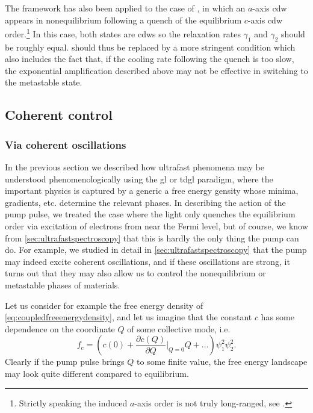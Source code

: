 The framework has also been applied to the case of , in which an $a$-axis \gls{cdw} appears in nonequilibrium following a quench of the equilibrium $c$-axis \gls{cdw} order.\footnote{Strictly speaking the induced $a$-axis order is not truly long-ranged, see \citet{zong_role_2021}.}
In this case, both states are \glspl{cdw} so the relaxation rates $\gamma_1$ and $\gamma_2$ should be roughly equal.
 should thus be replaced by a more stringent condition which also includes the fact that, if the cooling rate following the quench is too slow, the exponential amplification described above may not be effective in switching to the metastable state\citep{sun_transient_2020}.

\subsection{Coherent control}

\subsubsection{Via coherent oscillations}

In the previous section we described how ultrafast phenomena may be understood phenomenologically using the \gls{gl} or \gls{tdgl} paradigm, where the important physics is captured by a generic a free energy gensity whose minima, gradients, etc. determine the relevant phases.
In describing the action of the pump pulse, we treated the case where the light only quenches the equilibrium order via excitation of electrons from near the Fermi level, but of course, we know from \cref{sec:ultrafastspectroscopy} that this is hardly the only thing the pump can do.
For example, we studied in detail in \cref{sec:ultrafastspectroscopy} that the pump may indeed excite coherent oscillations, and if these oscillations are strong, it turns out that they may also allow us to control the nonequilibrium or metastable phases of materials.

Let us consider for example the free energy density of \cref{eq:coupledfreeenergydensity}, and let us imagine that the constant $c$ has some dependence on the coordinate $Q$ of some collective mode, i.e.
\begin{equation}\label{eq:latticefreeenergydensity}
f_c = \left(c(0)+\frac{\partial c(Q)}{\partial Q}\Big|_{Q=0}Q+\ldots\right)\psi_1^2\psi_2^2.
\end{equation}
Clearly if the pump pulse brings $Q$ to some finite value, the free energy landscape may look quite different compared to equilibrium.

